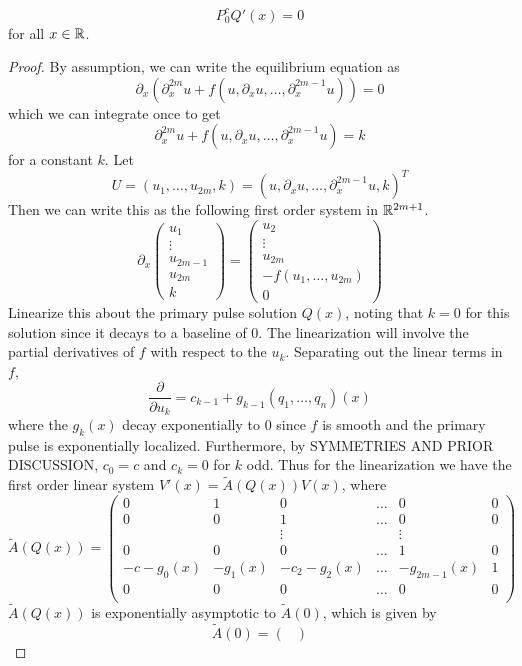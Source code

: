 \documentclass[thesis.tex]{subfiles}
\begin{document}
\begin{lemma}
\[
P_0^c Q'(x) = 0
\]
for all $x \in {\mathbb R}$.
\begin{proof}
By assumption, we can write the equilibrium equation as
\[
\partial_x( \partial_x^{2m}u + f(u, \partial_x u, \dots, \partial_x^{2m-1}u)) = 0
\]
which we can integrate once to get
\[
\partial_x^{2m}u + f(u, \partial_x u, \dots, \partial_x^{2m-1}u) = k
\]
for a constant $k$. Let
\[
U = (u_1, \dots, u_{2m}, k ) = 
(u, \partial_x u, \dots, \partial_x^{2m-1} u, k)^T
\]
Then we can write this as the following first order system in ${\mathbb R}^{2m+1}$.
\[
\partial_x
\begin{pmatrix}u_1 \\ \vdots \\ u_{2m-1} \\ u_{2m} \\ k \end{pmatrix} = 
\begin{pmatrix}
u_2 \\ \vdots \\ u_{2m} \\ -f(u_1, \dots, u_{2m}) \\ 0 
\end{pmatrix} 
\]
Linearize this about the primary pulse solution $Q(x)$, noting that $k = 0$ for this solution since it decays to a baseline of 0. The linearization will involve the partial derivatives of $f$ with respect to the $u_k$. Separating out the linear terms in $f$, 
\[
\frac{\partial}{\partial u_k} = c_{k-1} + g_{k-1}(q_1, \dots, q_n)(x)
\]
where the $g_k(x)$ decay exponentially to 0 since $f$ is smooth and the primary pulse is exponentially localized. Furthermore, by SYMMETRIES AND PRIOR DISCUSSION, $c_0 = c$ and $c_k = 0$ for $k$ odd. Thus for the linearization we have the first order linear system $V'(x) = \tilde{A}(Q(x))V(x)$, where
\[
\tilde{A}(Q(x)) = 
\begin{pmatrix}
0 & 1 & 0 & \dots & 0 & 0\\
0 & 0 & 1 & \dots & 0 & 0\\
&& \vdots && \vdots \\
0 & 0 & 0 & \dots & 1 & 0\\
-c - g_0(x) & -g_1(x) & -c_2 - g_2(x) & \dots 
& -g_{2m-1}(x) & 1 \\
0 & 0 & 0 & \dots & 0 & 0 \\
\end{pmatrix}
\]
$\tilde{A}(Q(x))$ is exponentially asymptotic to $\tilde{A}(0)$, which is given by
\[
\tilde{A}(0) = 
\begin{pmatrix}

\end{pmatrix}\]
\end{proof}
\end{lemma}
\end{document}
